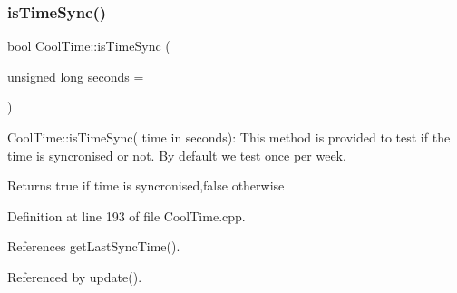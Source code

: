 \subsubsection{\texorpdfstring{is\+Time\+Sync()}{isTimeSync()}}
{\footnotesize\ttfamily bool Cool\+Time\+::is\+Time\+Sync (\begin{DoxyParamCaption}\item[{unsigned long}]{seconds = {} }\end{DoxyParamCaption})}

Cool\+Time\+::is\+Time\+Sync( time in seconds)\+: This method is provided to test if the time is syncronised or not. By default we test once per week.

\begin{DoxyReturn}{Returns}
true if time is syncronised,false otherwise 
\end{DoxyReturn}


Definition at line 193 of file Cool\+Time.\+cpp.



References get\+Last\+Sync\+Time().



Referenced by update().


